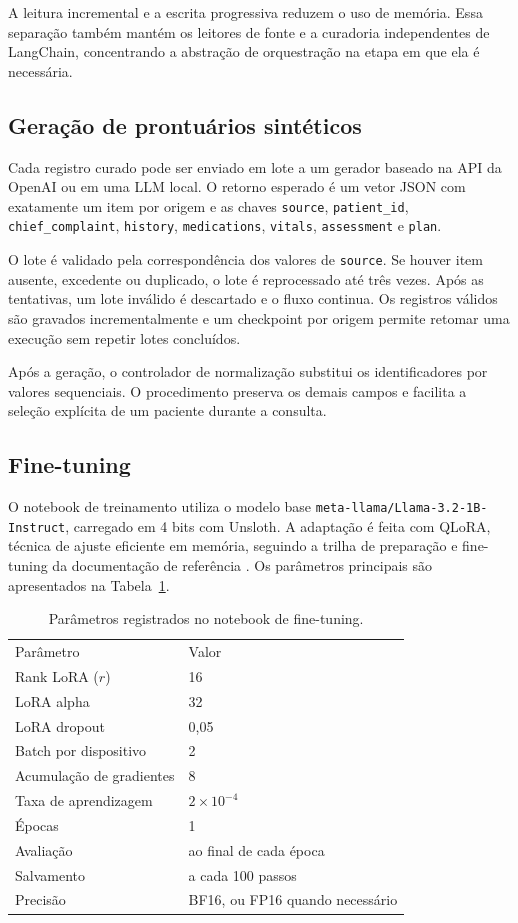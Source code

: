 \documentclass[12pt,a4paper]{article}
\begin{document}
A leitura incremental e a escrita progressiva reduzem o uso de memória. Essa separação também mantém os leitores de fonte e a curadoria independentes de LangChain, concentrando a abstração de orquestração na etapa em que ela é necessária.

\subsection{Geração de prontuários sintéticos}

Cada registro curado pode ser enviado em lote a um gerador baseado na API da OpenAI ou em uma LLM local. O retorno esperado é um vetor JSON com exatamente um item por origem e as chaves \texttt{source}, \texttt{patient\_id}, \texttt{chief\_complaint}, \texttt{history}, \texttt{medications}, \texttt{vitals}, \texttt{assessment} e \texttt{plan}.

O lote é validado pela correspondência dos valores de \texttt{source}. Se houver item ausente, excedente ou duplicado, o lote é reprocessado até três vezes. Após as tentativas, um lote inválido é descartado e o fluxo continua. Os registros válidos são gravados incrementalmente e um checkpoint por origem permite retomar uma execução sem repetir lotes concluídos.

Após a geração, o controlador de normalização substitui os identificadores por valores sequenciais. O procedimento preserva os demais campos e facilita a seleção explícita de um paciente durante a consulta.

\subsection{Fine-tuning}

O notebook de treinamento utiliza o modelo base \texttt{meta-llama/Llama-3.2-1B-Instruct}, carregado em 4 bits com Unsloth. A adaptação é feita com QLoRA, técnica de ajuste eficiente em memória, seguindo a trilha de preparação e fine-tuning da documentação de referência \cite{aula1,aula2,qlora}. Os parâmetros principais são apresentados na Tabela~\ref{tab:parametros}.

\begin{table}[ht]
\centering
\caption{Parâmetros registrados no notebook de fine-tuning.}
\label{tab:parametros}
\begin{tabular}{ll}
Parâmetro & Valor \\
Rank LoRA ($r$) & 16 \\
LoRA alpha & 32 \\
LoRA dropout & 0,05 \\
Batch por dispositivo & 2 \\
Acumulação de gradientes & 8 \\
Taxa de aprendizagem & $2\times10^{-4}$ \\
Épocas & 1 \\
Avaliação & ao final de cada época \\
Salvamento & a cada 100 passos \\
Precisão & BF16, ou FP16 quando necessário \\
\end{tabular}
\end{table}
\end{document}
